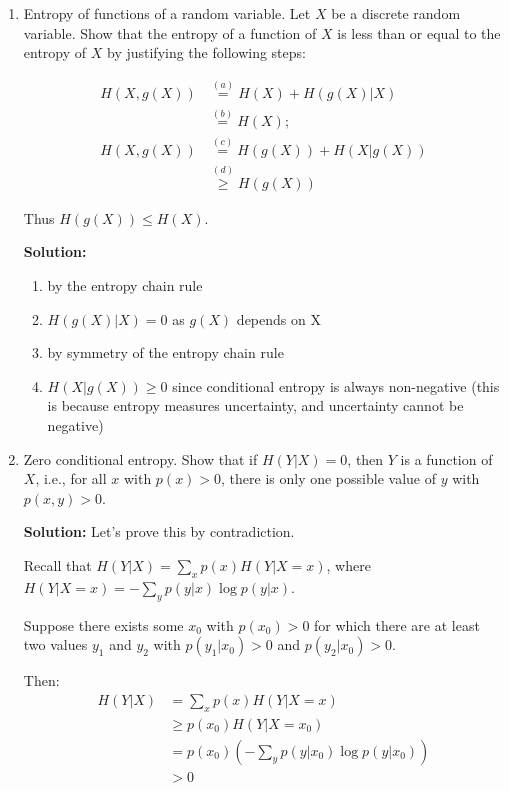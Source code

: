 \documentclass{article}
\begin{document}
\begin{enumerate}
    \item Entropy of functions of a random variable. Let $X$ be a discrete random variable. Show that the entropy of a function of $X$ is less than or equal to the entropy of $X$ by justifying the following steps:
    
    \begin{align}
        H(X, g(X)) &\stackrel{(a)}{=} H(X) + H(g(X)|X) \label{eq:2.166} \\
        &\stackrel{(b)}{=} H(X); \label{eq:2.167} \\
        H(X, g(X)) &\stackrel{(c)}{=} H(g(X)) + H(X|g(X)) \label{eq:2.168} \\
        &\stackrel{(d)}{\geq} H(g(X)) \label{eq:2.169}
    \end{align}
    
    Thus $H(g(X)) \leq H(X)$.

    \textbf{Solution:}
    \begin{enumerate}
        \item by the entropy chain rule 
        \item $H(g(X)|X)=0$ as $g(X)$ depends on X
        \item by symmetry of the entropy chain rule
        \item $H(X|g(X)) \geq 0$ since conditional entropy is always non-negative (this is because entropy measures uncertainty, and uncertainty cannot be negative)
    \end{enumerate}

    \item Zero conditional entropy. Show that if $H(Y|X) = 0$, then $Y$ is a function of $X$, i.e., for all $x$ with $p(x) > 0$, there is only one possible value of $y$ with $p(x,y) > 0$.
    
    \textbf{Solution:} Let's prove this by contradiction.
    
    Recall that $H(Y|X) = \sum_x p(x)H(Y|X=x)$, where $H(Y|X=x) = -\sum_y p(y|x)\log p(y|x)$.
    
    Suppose there exists some $x_0$ with $p(x_0) > 0$ for which there are at least two values $y_1$ and $y_2$ with $p(y_1|x_0) > 0$ and $p(y_2|x_0) > 0$.
    
    Then:
    \begin{align*}
        H(Y|X) &= \sum_x p(x)H(Y|X=x) \\
        &\geq p(x_0)H(Y|X=x_0) \\
        &= p(x_0)(-\sum_y p(y|x_0)\log p(y|x_0)) \\
        &> 0
    \end{align*}
    

\end{enumerate}
\end{document}
